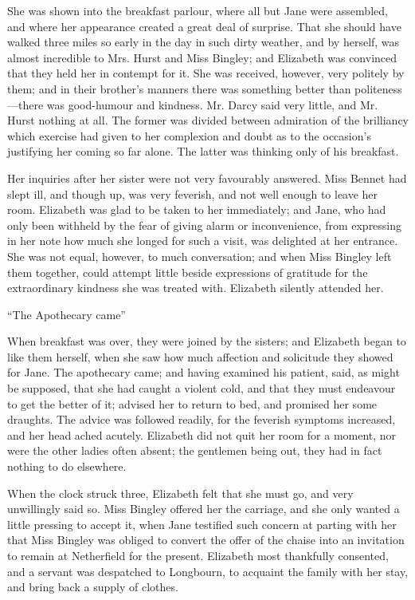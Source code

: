 \documentclass[12pt,openright]{book}
\begin{document}
She was shown into the breakfast parlour, where all but Jane were assembled, and where her appearance created a great deal of surprise. That she should have walked three miles so early in the day in such dirty weather, and by herself, was almost incredible to Mrs. Hurst and Miss Bingley; and Elizabeth was convinced that they held her in contempt for it. She was received, however, very politely by them; and in their brother’s manners there was something better than politeness—there was good-humour and kindness. Mr. Darcy said very little, and Mr. Hurst nothing at all. The former was divided between admiration of the brilliancy which exercise had given to her complexion and doubt as to the occasion’s justifying her coming so far alone. The latter was thinking only of his breakfast.

Her inquiries after her sister were not very favourably answered. Miss Bennet had slept ill, and though up, was very feverish, and not well enough to leave her room. Elizabeth was glad to be taken to her immediately; and Jane, who had only been withheld by the fear of giving alarm or inconvenience, from expressing in her note how much she longed for such a visit, was delighted at her entrance. She was not equal, however, to much conversation; and when Miss Bingley left them together, could attempt little beside expressions of gratitude for the extraordinary kindness she was treated with. Elizabeth silently attended her.

“The Apothecary came”


When breakfast was over, they were joined by the sisters; and Elizabeth began to like them herself, when she saw how much affection and solicitude they showed for Jane. The apothecary came; and having examined his patient, said, as might be supposed, that she had caught a violent cold, and that they must endeavour to get the better of it; advised her to return to bed, and promised her some draughts. The advice was followed readily, for the feverish symptoms increased, and her head ached acutely. Elizabeth did not quit her room for a moment, nor were the other ladies often absent; the gentlemen being out, they had in fact nothing to do elsewhere.

When the clock struck three, Elizabeth felt that she must go, and very unwillingly said so. Miss Bingley offered her the carriage, and she only wanted a little pressing to accept it, when Jane testified such concern at parting with her that Miss Bingley was obliged to convert the offer of the chaise into an invitation to remain at Netherfield for the present. Elizabeth most thankfully consented, and a servant was despatched to Longbourn, to acquaint the family with her stay, and bring back a supply of clothes.
\end{document}

